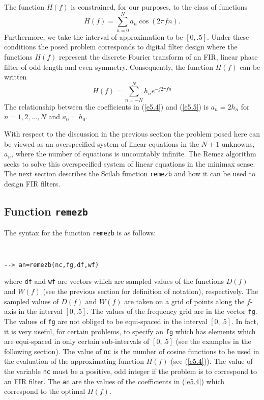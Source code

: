 	The function $H(f)$ is 
constrained, for our purposes, to the class of 
functions
%
\begin{equation}
H(f)=\sum_{n=0}^{N}a_n\cos(2\pi fn).
\label{e5.4}
\end{equation}
%
Furthermore, we take the interval of approximation to
be $[0,.5]$.  Under these conditions the posed problem
corresponds to digital filter design where the functions
$H(f)$ represent the discrete Fourier transform of an
FIR, linear phase filter of odd length and even symmetry.
Consequently, the function $H(f)$ can be written
%
\begin{equation}
H(f)=\sum_{n=-N}^{N}h_n e^{-j2\pi fn}
\label{e5.5}
\end{equation}
%
The relationship between the 
coefficients in (\ref{e5.4}) and (\ref{e5.5})
is $a_n=2h_n$ for $n=1,2,\ldots,N$ and $a_0=h_0$.

   With respect to the discussion in the previous section the problem
posed here can be viewed as an overspecified system
of linear equations in the  $N+1$ unknowns, $a_n$, where the
number of equations is uncountably infinite.  The Remez
algorithm seeks to solve this overspecified system of linear equations
in the minimax sense.  The next section describes the Scilab
function {\tt remezb} and how it can be used to design FIR filters.

\subsection{Function {\tt remezb}}

	The syntax for the function {\tt remezb} is as 
follows:
{\tt
\begin{verbatim}
--> an=remezb(nc,fg,df,wf)
\end{verbatim}}
\noindent where {\tt df} and {\tt wf} are vectors which are sampled values
of the functions $D(f)$ and $W(f)$ (see the previous section for definition
of notation), respectively.  The sampled
values of $D(f)$ and $W(f)$ are taken on a grid of points
along the $f$-axis in the interval $[0,.5]$.
The values of the frequency grid are in the vector 
{\tt fg}.  
The values of {\tt fg} are not obliged to be equi-spaced in the interval
$[0,.5]$.  In fact,
it is very useful, for certain problems, to specify an
{\tt fg} which has elements which are equi-spaced in only certain
sub-intervals of $[0,.5]$ (see the examples in the following section).
The value of {\tt nc} is the number
of cosine functions to be used in the
evaluation of the approximating function
$H(f)$ (see (\ref{e5.4})).  
The value of the variable {\tt nc} must be a positive, odd integer
if the problem is to correspond to an FIR filter.
The {\tt an} are the values of the
coefficients in (\ref{e5.4}) which correspond to the optimal
$H(f)$.

